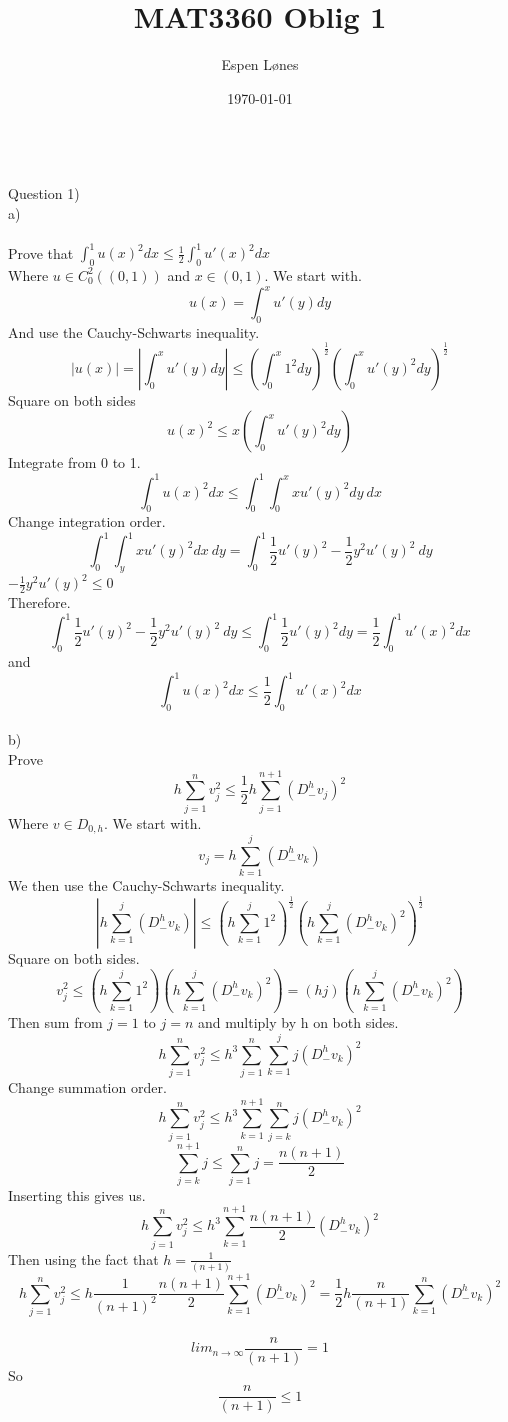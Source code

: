 \documentclass[12pt, letterpaper, twoside]{article}
\begin{document}
\title{MAT3360 Oblig 1}
\author{Espen Lønes}
\date{\today}
\maketitle
\ \\
Question 1)\\
a)\\
\ \\
Prove that
$\int_0^1 u(x)^2 dx \leq \frac{1}{2} \int_0^1 u'(x)^2 dx$\\
Where $u \in C_0^2((0,1))$ and $x \in (0,1)$. We start with.
$$
u(x) = \int_0^x u'(y) dy 
$$
And use the Cauchy-Schwarts inequality.
$$
|u(x)| = |\int_0^x u'(y) dy| \leq (\int_0^x 1^2 dy)^{\frac{1}{2}}(\int_0^x u'(y)^2 dy)^{\frac{1}{2}}
$$
Square on both sides
$$
u(x)^2 \leq x(\int_0^x u'(y)^2 dy)
$$
Integrate from 0 to 1.
$$
\int_0^1 u(x)^2 dx \leq \int_0^1 \int_0^x xu'(y)^2 dy\ dx
$$
Change integration order.
$$
\int_0^1 \int_y^1 xu'(y)^2 dx\ dy
=
\int_0^1 \frac{1}{2} u'(y)^2 - \frac{1}{2} y^2 u'(y)^2\ dy
$$ 
$
- \frac{1}{2} y^2 u'(y)^2 \leq 0 
$
\\
Therefore. 
$$
\int_0^1 \frac{1}{2} u'(y)^2 - \frac{1}{2} y^2 u'(y)^2\ dy
\leq
\int_0^1 \frac{1}{2} u'(y)^2 dy
=
\frac{1}{2} \int_0^1 u'(x)^2 dx
$$
and
$$
\int_0^1 u(x)^2 dx \leq \frac{1}{2} \int_0^1 u'(x)^2 dx
$$
\ \\
b)\\
Prove
$$
h\sum_{j=1}^n v_j^2 \leq \frac{1}{2} h \sum_{j=1}^{n+1} (D_-^h v_j)^2
$$
Where $v \in D_{0,h}$. We start with.
$$
v_j = h\sum_{k=1}^j (D_-^h v_k)
$$
We then use the Cauchy-Schwarts inequality.
$$
|h\sum_{k=1}^j (D_-^h v_k)| \leq (h\sum_{k=1}^j 1^2)^{\frac{1}{2}}(h \sum_{k=1}^j (D_-^h v_k)^2)^{\frac{1}{2}}
$$
Square on both sides.
$$
v_j^2 \leq (h\sum_{k=1}^j 1^2)(h \sum_{k=1}^j (D_-^h v_k)^2)
=
(hj)(h \sum_{k=1}^j (D_-^h v_k)^2)
$$
Then sum from $j=1$ to $j=n$ and multiply by h on both sides.
$$
h\sum_{j=1}^n v_j^2 \leq h^3 \sum_{j=1}^n \sum_{k=1}^j j(D_-^h v_k)^2
$$
Change summation order.
$$
h\sum_{j=1}^n v_j^2 \leq h^3 \sum_{k=1}^{n+1} \sum_{j=k}^n j(D_-^h v_k)^2
$$
$$
\sum_{j=k}^{n+1} j \leq \sum_{j=1}^n j = \frac{n(n+1)}{2}
$$
Inserting this gives us.
$$
h\sum_{j=1}^n v_j^2 \leq h^3 \sum_{k=1}^{n+1} \frac{n(n+1)}{2} (D_-^h v_k)^2
$$
Then using the fact that $h=\frac{1}{(n+1)}$
$$
h\sum_{j=1}^n v_j^2 \leq h \frac{1}{(n+1)^2} \frac{n(n+1)}{2} \sum_{k=1}^{n+1} (D_-^h v_k)^2
=
\frac{1}{2} h \frac{n}{(n+1)} \sum_{k=1}^n (D_-^h v_k)^2
$$
\ \\
$$
lim_{n \to \infty} \frac{n}{(n+1)} = 1
$$ 
So
$$
\frac{n}{(n+1)} \leq 1
$$
\end{document}
